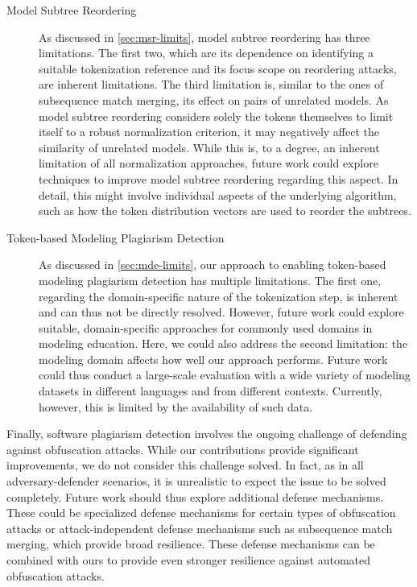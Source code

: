\begin{description}
\item[Model Subtree Reordering]
As discussed in \autoref{sec:msr-limits}, model subtree reordering has three limitations. The first two, which are its dependence on identifying a suitable tokenization reference and its focus scope on reordering attacks, are inherent limitations. The third limitation is, similar to the ones of subsequence match merging, its effect on pairs of unrelated models. As model subtree reordering considers solely the tokens themselves to limit itself to a robust normalization criterion, it may negatively affect the similarity of unrelated models.
While this is, to a degree, an inherent limitation of all normalization approaches, future work could explore techniques to improve model subtree reordering regarding this aspect. In detail, this might involve individual aspects of the underlying algorithm, such as how the token distribution vectors are used to reorder the subtrees.

\item[Token-based Modeling Plagiarism Detection]
As discussed in \autoref{sec:mde-limits}, our approach to enabling token-based modeling plagiarism detection has multiple limitations. The first one, regarding the domain-specific nature of the tokenization step, is inherent and can thus not be directly resolved. However, future work could explore suitable, domain-specific approaches for commonly used domains in modeling education.
Here, we could also address the second limitation: the modeling domain affects how well our approach performs.
Future work could thus conduct a large-scale evaluation with a wide variety of modeling datasets in different languages and from different contexts. Currently, however, this is limited by the availability of such data.
\end{description}

Finally, software plagiarism detection involves the ongoing challenge of defending against obfuscation attacks. While our contributions provide significant improvements, we do not consider this challenge solved. In fact, as in all adversary-defender scenarios, it is unrealistic to expect the issue to be solved completely.
Future work should thus explore additional defense mechanisms. These could be specialized defense mechanisms for certain types of obfuscation attacks or attack-independent defense mechanisms such as subsequence match merging, which provide broad resilience. These defense mechanisms can be combined with ours to provide even stronger resilience against automated obfuscation attacks.

